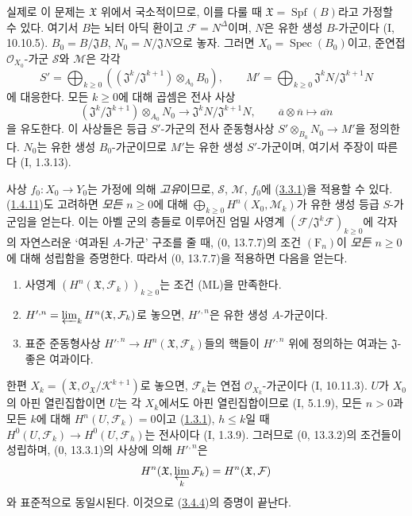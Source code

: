 실제로 이 문제는 $\mathfrak X$ 위에서 국소적이므로, 이를 다룰 때
$\mathfrak X=\operatorname{Spf}(B)$라고 가정할 수 있다. 여기서 $B$는
뇌터 아딕 환이고 $\mathcal F=N^\Delta$이며, $N$은 유한 생성
$B$-가군이다 (I, 10.10.5). $B_0=B/\mathfrak J B$,
$N_0=N/\mathfrak JN$으로 놓자. 그러면
$X_0=\operatorname{Spec}(B_0)$이고, 준연접 $\mathcal O_{X_0}$-가군
$\mathcal S$와 $\mathcal M$은 각각
\[
S'=\bigoplus_{k\geq0}
((\mathfrak J^k/\mathfrak J^{k+1})\otimes_{A_0}B_0),\qquad
M'=\bigoplus_{k\geq0}\mathfrak J^kN/\mathfrak J^{k+1}N
\]
에 대응한다. 모든 $k\geq0$에 대해 곱셈은 전사 사상
\[
(\mathfrak J^k/\mathfrak J^{k+1})\otimes_{A_0}N_0
\longrightarrow\mathfrak J^kN/\mathfrak J^{k+1}N,
\qquad \overline a\otimes\overline n\longmapsto\overline{an}
\]
을 유도한다. 이 사상들은 등급 $S'$-가군의 전사 준동형사상
$S'\otimes_{B_0}N_0\to M'$을 정의한다. $N_0$는 유한 생성
$B_0$-가군이므로 $M'$는 유한 생성 $S'$-가군이며, 여기서 주장이 따른다
(I, 1.3.13).

사상 $f_0:X_0\to Y_0$는 가정에 의해 \emph{고유}이므로,
$\mathcal S$, $\mathcal M$, $f_0$에
(\hyperref[III.3.3.1-fr]{3.3.1})을 적용할 수 있다.
(\hyperref[III.1.4.11-fr]{1.4.11})도 고려하면 \emph{모든 $n\geq0$}에
대해 $\bigoplus_{k\geq0}H^n(X_0,\mathcal M_k)$가 유한 생성 등급
$S$-가군임을 얻는다. 이는 아벨 군의 층들로 이루어진 엄밀 사영계
$(\mathcal F/\mathfrak J^k\mathcal F)_{k\geq0}$에 각자의 자연스러운
‘여과된 $A$-가군’ 구조를 줄 때, (0, 13.7.7)의 조건
$(\mathrm F_n)$이 \emph{모든 $n\geq0$}에 대해 성립함을 증명한다.
따라서 (0, 13.7.7)을 적용하면 다음을 얻는다.
\begin{enumerate}
\item[$1^\circ$] 사영계
$(H^n(\mathfrak X,\mathcal F_k))_{k\geq0}$는 조건 (ML)을 만족한다.
\item[$2^\circ$]
$H'^{,n}=\varprojlim_kH^n(\mathfrak X,\mathcal F_k)$로 놓으면,
$H'^{,n}$은 유한 생성 $A$-가군이다.
\item[$3^\circ$] 표준 준동형사상
$H'^{,n}\to H^n(\mathfrak X,\mathcal F_k)$들의 핵들이 $H'^{,n}$ 위에
정의하는 여과는 $\mathfrak J$-좋은 여과이다.
\end{enumerate}

한편 $X_k=(\mathfrak X,\mathcal O_{\mathfrak X}/\mathcal K^{k+1})$로
놓으면, $\mathcal F_k$는 연접 $\mathcal O_{X_k}$-가군이다
(I, 10.11.3). $U$가 $X_0$의 아핀 열린집합이면 $U$는 각 $X_k$에서도
아핀 열린집합이므로 (I, 5.1.9), 모든 $n>0$과 모든 $k$에 대해
$H^n(U,\mathcal F_k)=0$이고
(\hyperref[III.1.3.1-fr]{1.3.1}), $h\leq k$일 때
$H^0(U,\mathcal F_k)\to H^0(U,\mathcal F_h)$는 전사이다 (I, 1.3.9).
그러므로 (0, 13.3.2)의 조건들이 성립하며, (0, 13.3.1)의 사상에 의해
$H'^{,n}$은
\[
H^n(\mathfrak X,\varprojlim_k\mathcal F_k)
=H^n(\mathfrak X,\mathcal F)
\]
와 표준적으로 동일시된다. 이것으로
(\hyperref[III.3.4.4-fr]{3.4.4})의 증명이 끝난다.

